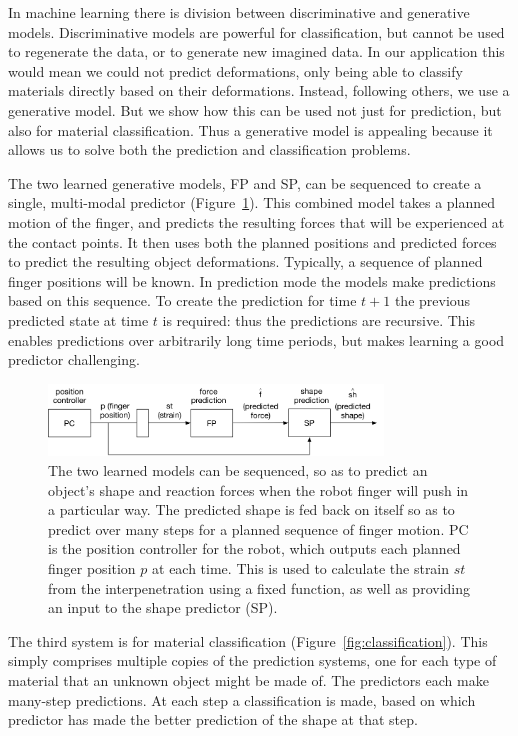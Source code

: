 \documentclass[journal]{IEEEtran}
\newcommand{\comment}[1]{{\color{red} #1}}
\begin{document}
\comment{In machine learning there is division between discriminative and generative models. Discriminative models are powerful for classification, but cannot be used to regenerate the data, or to generate new imagined data. In our application this would mean we could not predict deformations, only being able to classify materials directly based on their deformations. Instead, following others, we use a generative model. But we show how this can be used not just for prediction, but also for material classification. Thus a generative model is appealing because it allows us to solve both the prediction and classification problems.}

The two learned generative models, FP and SP, can be sequenced to create a single, multi-modal predictor (Figure~\ref{fig:prediction}). This combined model takes a planned motion of the finger, and predicts the resulting forces that will be experienced at the contact points. It then uses both the planned positions and predicted forces to predict the resulting object deformations. Typically, a sequence of planned finger positions will be known. In prediction mode the models make predictions based on this sequence. To create the prediction for time $t+1$ the previous predicted state at time $t$ is required: thus the predictions are recursive. This enables predictions over arbitrarily long time periods, but makes learning a good predictor challenging.

\begin{figure}[t]
\centering
\includegraphics[width=3.5in]{figures/prediction}%
\caption{The two learned models can be sequenced, so as to predict an object's shape and reaction forces when the robot finger will push in a particular way. The predicted shape is fed back on itself so as to predict over many steps for a planned sequence of finger motion. PC is the position controller for the robot, which outputs each planned finger position $p$ at each time. This is used to calculate the strain $st$ from the interpenetration using a fixed function, as well as providing an input to the shape predictor (SP).}
\label{fig:prediction}
\end{figure}

The third system is for material classification (Figure~\ref{fig:classification}). This simply comprises multiple copies of the prediction systems, one for each type of material that an unknown object might be made of. The predictors each make many-step predictions. At each step a classification is made, based on which predictor has made the better prediction of the shape at that step.
\end{document}
